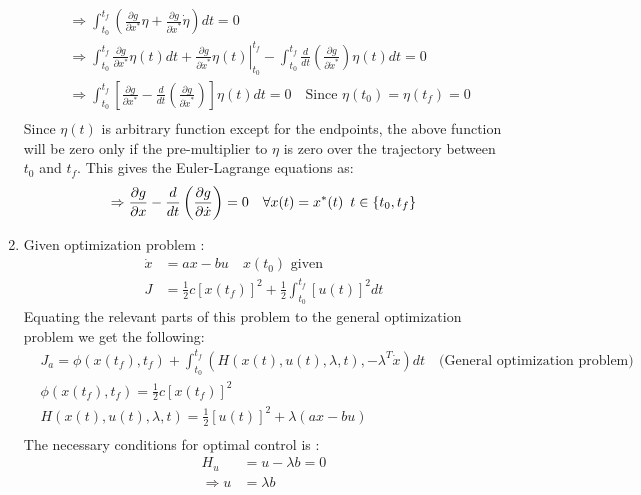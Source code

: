\begin{enumerate}
\begin{align*}
   &\Rightarrow \int_{t_0}^{t_f} \left( \frac{\partial g}{\partial x^*} \eta  + \frac{\partial g}{\partial \dot x^*} \dot \eta \right) dt = 0\\
   &\Rightarrow \int_{t_0}^{t_f} \frac{\partial g}{\partial x^*} \eta(t) dt +\left. \frac{\partial g}{\partial \dot x^*} \eta(t)\right|_{t_0}^{t_f} - \int_{t_0}^{t_f} \frac{d}{dt} \left( \frac{\partial g}{\partial \dot x^*} \right) \eta (t) dt = 0 \\
   &\Rightarrow \int_{t_0}^{t_f} \left[ \frac{\partial g}{\partial x^*} - \frac{d}{dt} \left( \frac{\partial g}{\partial \dot x^*} \right)\right] \eta (t) dt = 0 \quad \text{Since } \eta(t_0) = \eta (t_f) = 0\\
  \end{align*}
  Since $\eta(t)$ is arbitrary function except for the endpoints, the above function will be zero only if the pre-multiplier to $\eta$ is zero over the trajectory between $t_0 $ and $t_f$. This gives the Euler-Lagrange equations as:
  \begin{equation*}
  \Rightarrow  \frac{\partial g}{\partial x} - \frac{d}{dt} \left( \frac{\partial g}{\partial \dot x} \right) = 0 \quad \forall x(t) = x^*(t) \enskip t \in \{t_0,t_f\} 
  \end{equation*}
  \item Given optimization problem :
  \begin{align*}
   \dot x &= ax - bu \quad x(t_0) \text{ given}\\
   J  &= \frac{1}{2} c \left[ x(t_f) \right]^2 + \frac{1}{2} \int_{t_0}^{t_f} \left[ u(t) \right]^2 dt
  \end{align*}
  Equating the relevant parts of this problem to the general optimization problem we get the following:
  \begin{align*}
   &J_a = \phi(x(t_f),t_f) + \int_{t_0}^{t_f}\left( H(x(t),u(t),\lambda, t), -\lambda^T \dot x\right) dt \quad \text{(General optimization problem)}\\
   &\phi(x(t_f),t_f) =  \frac{1}{2} c \left[ x(t_f) \right]^2 \\
   &H(x(t),u(t),\lambda, t) = \frac{1}{2} \left[ u(t) \right]^2 + \lambda(ax - bu) \\
  \end{align*}
  The necessary conditions for optimal control is :
  \begin{align*}
   H_u &= u - \lambda b = 0 \\
   \Rightarrow u &= \lambda b\\

\end{align*}
\end{enumerate}

